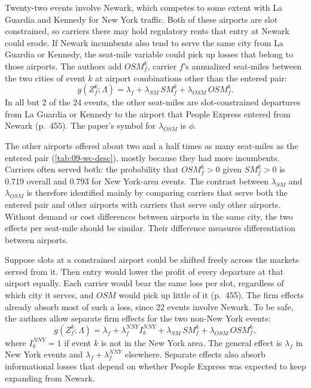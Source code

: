 Twenty-two events involve Newark, which competes to some extent with La Guardia and Kennedy for New
York traffic. Both of these airports are slot constrained, so carriers there may hold regulatory rents
that entry at Newark could erode. If Newark incumbents also tend to serve the same city from La Guardia
or Kennedy, the seat-mile variable could pick up losses that belong to those airports. The authors add
$\mathit{OSM}^k_f$, carrier $f$'s annualized seat-miles between the two cities of event $k$ at airport
combinations other than the entered pair:
\begin{equation}\label{eq:09-wc-osm}
g(Z^k_f;\Lambda)=\lambda_f+\lambda_{SM}\,\mathit{SM}^k_f+\lambda_{OSM}\,\mathit{OSM}^k_f .
\end{equation}
In all but 2 of the 24 events, the other seat-miles are slot-constrained departures from La Guardia or
Kennedy to the airport that People Express entered from Newark (p.~455). The paper's symbol
for $\lambda_{OSM}$ is $\phi$.

The other airports offered about two and a half times as many seat-miles as the entered pair
(\cref{tab:09-wc-desc}), mostly because they had more incumbents. Carriers often served both: the
probability that $\mathit{OSM}^k_f>0$ given $\mathit{SM}^k_f>0$ is 0.719 overall and 0.793 for New
York-area events. The contrast between $\lambda_{SM}$ and $\lambda_{OSM}$ is therefore identified
mainly by comparing carriers that serve both the entered pair and other airports with carriers that
serve only other airports. Without demand or cost differences between airports in the same city, the
two effects per seat-mile should be similar. Their difference measures differentiation between
airports.

Suppose slots at a constrained airport could be shifted freely across the markets served from it.
Then entry would lower the profit of every departure at that airport equally. Each carrier would bear
the same loss per slot, regardless of which city it serves, and $\mathit{OSM}$ would pick up little
of it (p.~455). The firm effects already absorb most of such a loss, since 22 events involve
Newark. To be safe, the authors allow separate firm effects for the two non-New York events:
\begin{equation}\label{eq:09-wc-nny}
g(Z^k_f;\Lambda)=\lambda_f+\lambda^{NNY}_f I^{NNY}_k+\lambda_{SM}\,\mathit{SM}^k_f
+\lambda_{OSM}\,\mathit{OSM}^k_f ,
\end{equation}
where $I^{NNY}_k=1$ if event $k$ is not in the New York area. The general effect is $\lambda_f$ in New
York events and $\lambda_f+\lambda^{NNY}_f$ elsewhere. Separate effects also absorb informational
losses that depend on whether People Express was expected to keep expanding from Newark.

